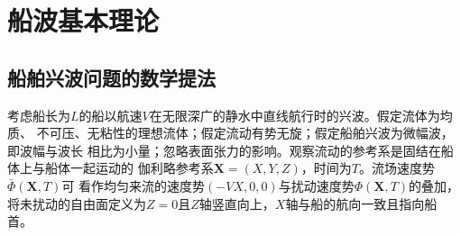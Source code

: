 
\chapter{船波基本理论}
\label{chap:shipwav}

\section{船舶兴波问题的数学提法}
\label{sec:mathsform}

考虑船长为$L$的船以航速$V$在无限深广的静水中直线航行时的兴波。假定流体为均质、
不可压、无粘性的理想流体；假定流动有势无旋；假定船舶兴波为微幅波，即波幅与波长
相比为小量；忽略表面张力的影响。观察流动的参考系是固结在船体上与船体一起运动的
伽利略参考系$\mathbf{X}=(X,Y,Z)$，时间为$T$。流场速度势$\bar{\Phi}(\mathbf{X},T)$可
看作均匀来流的速度势$(-VX,0,0)$与扰动速度势$\Phi(\mathbf{X},T)$的叠加，
将未扰动的自由面定义为$Z=0$且$Z$轴竖直向上，$X$轴与船的航向一致且指向船首。

